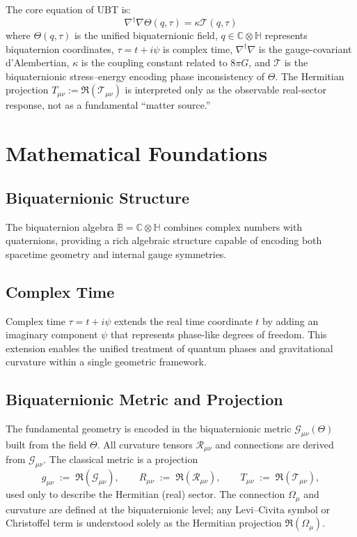 \documentclass[12pt]{article}
\begin{document}
The core equation of UBT is:
\begin{equation}
\nabla^\dagger\nabla\Theta(q,\tau) = \kappa \mathcal{T}(q,\tau)
\end{equation}
where $\Theta(q,\tau)$ is the unified biquaternionic field, $q \in \mathbb{C}\otimes\mathbb{H}$ represents biquaternion coordinates, $\tau = t + i\psi$ is complex time, $\nabla^\dagger\nabla$ is the gauge-covariant d'Alembertian, $\kappa$ is the coupling constant related to $8\pi G$, and $\mathcal{T}$ is the biquaternionic stress--energy encoding phase inconsistency of $\Theta$. The Hermitian projection $T_{\mu\nu}:=\Re(\mathcal{T}_{\mu\nu})$ is interpreted only as the observable real-sector response, not as a fundamental ``matter source.''

\section{Mathematical Foundations}

\subsection{Biquaternionic Structure}

The biquaternion algebra $\mathbb{B} = \mathbb{C}\otimes\mathbb{H}$ combines complex numbers with quaternions, providing a rich algebraic structure capable of encoding both spacetime geometry and internal gauge symmetries.

\subsection{Complex Time}

Complex time $\tau = t + i\psi$ extends the real time coordinate $t$ by adding an imaginary component $\psi$ that represents phase-like degrees of freedom. This extension enables the unified treatment of quantum phases and gravitational curvature within a single geometric framework.

\subsection{Biquaternionic Metric and Projection}

The fundamental geometry is encoded in the biquaternionic metric $\mathcal{G}_{\mu\nu}(\Theta)$ built from the field $\Theta$. All curvature tensors $\mathcal{R}_{\mu\nu}$ and connections are derived from $\mathcal{G}_{\mu\nu}$. The classical metric is a projection
\[
g_{\mu\nu} \;:=\; \Re\!\left(\mathcal{G}_{\mu\nu}\right),
\qquad
R_{\mu\nu} \;:=\; \Re\!\left(\mathcal{R}_{\mu\nu}\right),
\qquad
T_{\mu\nu} \;:=\; \Re\!\left(\mathcal{T}_{\mu\nu}\right),
\]
used only to describe the Hermitian (real) sector. The connection $\Omega_\mu$ and curvature are defined at the biquaternionic level; any Levi--Civita symbol or Christoffel term is understood solely as the Hermitian projection $\Re(\Omega_\mu)$.
\end{document}
